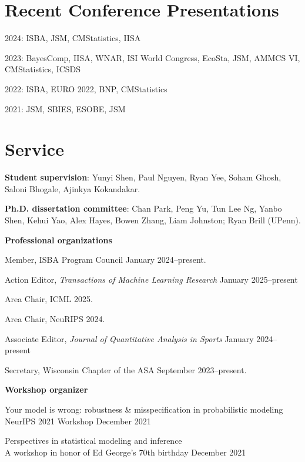 \documentclass[10pt]{article}
\renewenvironment{itemize}{
  \begin{list}{}{
    \setlength{\leftmargin}{1.5em}
  }
}{
  \end{list}
}
\begin{document}
\section*{Recent Conference Presentations}

\begin{itemize}

\item{2024: ISBA, JSM, CMStatistics, IISA}
\item{2023: BayesComp, IISA, WNAR, ISI World Congress, EcoSta, JSM, AMMCS VI, CMStatistics, ICSDS}
\item{2022: ISBA, EURO 2022, BNP, CMStatistics}
\item{2021: JSM, SBIES, ESOBE, JSM}

\end{itemize}

\section*{Service}

\textbf{Student supervision}: Yunyi Shen, Paul Nguyen, Ryan Yee, Soham Ghosh, Saloni Bhogale, Ajinkya Kokandakar.

\textbf{Ph.D. dissertation committee}: Chan Park, Peng Yu, Tun Lee Ng, Yanbo Shen, Kehui Yao, Alex Hayes, Bowen Zhang, Liam Johnston; Ryan Brill (UPenn).

\textbf{Professional organizations}

\begin{itemize}
\item{Member, ISBA Program Council \hfill January 2024--present.}
\item{Action Editor, \textit{Transactions of Machine Learning Research} \hfill January 2025--present}
\item{Area Chair, ICML \hfill 2025.}
\item{Area Chair, NeuRIPS \hfill 2024.}
\item{Associate Editor, \textit{Journal of Quantitative Analysis in Sports} \hfill January 2024--present}
\item{Secretary, Wisconsin Chapter of the ASA \hfill September 2023--present.}

\end{itemize}

\textbf{Workshop organizer} 

\begin{itemize}
\item{Your model is wrong: robustness \& misspecification in probabilistic modeling \\
NeurIPS 2021 Workshop \hfill December 2021}
\item{Perspectives in statistical modeling and inference \\
A workshop in honor of Ed George's 70th birthday \hfill December 2021}
\end{itemize}
\end{document}
